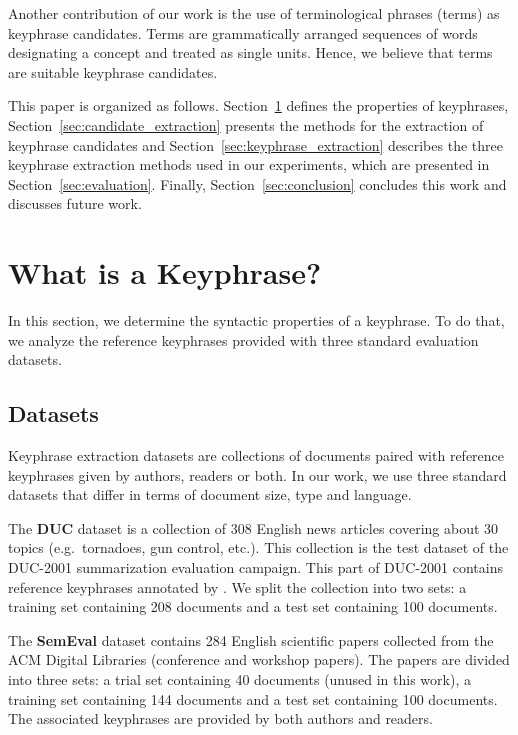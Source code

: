   Another contribution of our work is the use of terminological phrases (terms)
  as keyphrase candidates. Terms are grammatically arranged sequences of
  words designating a concept and treated as single units. Hence, we believe
  that terms are suitable keyphrase candidates.

  This paper is organized as follows.
  Section~\ref{sec:definition_of_candidate_keyphrases} defines the properties of
  keyphrases, Section~\ref{sec:candidate_extraction} presents the methods for
  the extraction of keyphrase candidates and
  Section~\ref{sec:keyphrase_extraction} describes the three keyphrase
  extraction methods used in our experiments, which are presented in
  Section~\ref{sec:evaluation}. Finally, Section~\ref{sec:conclusion} concludes
  this work and discusses future work.

\section{What is a Keyphrase?}
\label{sec:definition_of_candidate_keyphrases}
  In this section, we determine the syntactic properties of a keyphrase. To do
  that, we analyze the reference keyphrases provided with three standard
  evaluation datasets.

  \subsection{Datasets}
  \label{subsec:keyphrase_extraction_datasets}
    Keyphrase extraction datasets are collections of documents paired with
    reference keyphrases given by authors, readers or both. In our work, we use
    three standard datasets that differ in terms of document size,  type and
    language.

    The \textbf{DUC} dataset \cite{over2001duc} is a collection of 308 English
    news articles covering about 30 topics (e.g.~tornadoes, gun control, etc.).
    This collection is the test dataset of the DUC-2001 summarization evaluation
    campaign. This part of DUC-2001 contains reference keyphrases annotated by
    . We split the collection into two sets: a
    training set containing 208 documents and a test set containing 100
    documents.

    The \textbf{SemEval} dataset \cite{kim2010semeval} contains 284 English
    scientific papers collected from the ACM Digital Libraries (conference and
    workshop papers). The papers are divided into three sets: a trial set
    containing 40 documents (unused in this work), a training set containing 144
    documents and a test set containing 100 documents. The associated keyphrases
    are provided by both authors and readers.


